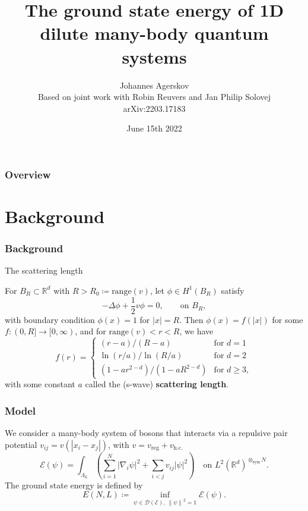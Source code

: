 \documentclass{beamer}[10]
\title{The ground state energy of 1D dilute many-body quantum systems}
\subtitle{}
\author{Johannes Agerskov\\\vspace{0.2 cm}
	\scriptsize{Based on joint work with Robin Reuvers and Jan Philip Solovej\\
		arXiv:2203.17183}}
\institute{QMATH \\ University of Copenhagen}
\date{June 15th 2022}
\newcommand{\norm}[1]{\left\lVert #1 \right\rVert}
\newcommand{\abs}[1]{\left\lvert #1 \right\rvert}
\newcommand{\R}{\mathbb{R}}
\begin{document}
\frame{\titlepage \vspace{-0.5cm}
}

\frame
{
\frametitle{Overview}
\tableofcontents%
}

\section{Background}

\begin{frame}
\frametitle{Background}
\begin{block}{The scattering length}
	\begin{Theorem}
		For $ B_R\subset \R^d $ with $ R>R_0\coloneqq\text{range}(v) $, let $ \phi\in H^1(B_{R}) $ satisfy
	 \begin{equation}
		 -\Delta \phi +\frac12 v\phi=0,\qquad \text{on }B_R,
		 \end{equation}
		 with boundary condition $ \phi(x)=1 $ for $ \abs{x}=R$.
		 Then $ \phi(x)=f(\abs{x}) $ for some $ f:(0,R]\to [0,\infty) $, and for $ \text{range}(v)<r<R $, we have \begin{equation}
		 f(r)=\begin{cases}
		 (r-a)/(R-a) &\text{for }d=1\\
		 \ln(r/a)/\ln(R/a) &\text{for }d=2\\
		 (1-ar^{2-d})/(1-aR^{2-d})&\text{for }d\geq 3,
		 \end{cases}
		 \end{equation}
		 with some constant $ a $ called the (s-wave) \textbf{scattering length}.
	\end{Theorem}
\end{block}	
\end{frame}

\begin{frame}
	\frametitle{Model}
	We consider a many-body system of bosons that interacts via a repulsive pair potential $ v_{ij}=v(\abs{x_i-x_j}) $, with $ v=v_{\text{reg}}+v_{\text{h.c.}} $\begin{equation}
	\mathcal{E}(\psi)=\int_{\Lambda_L}\left(\sum_{i=1}^{N}\abs{\nabla_i\psi}^2+\sum_{i<j} v_{ij}\abs{\psi}^2\right)\quad \text{on } L^2(\R^d)^{\otimes_{\text{sym}} N}.
	\end{equation}
	The ground state energy is defined by 
	$$
	E(N,L)\coloneqq\inf_{\psi\in\mathcal{D}(\mathcal{E}),\ \norm{\psi}^2=1}\mathcal{E}(\psi).
	$$
\end{frame}
\end{document}
